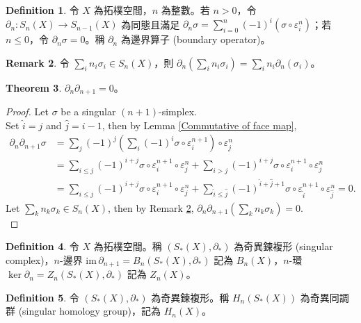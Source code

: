 \documentclass[12pt]{article}
\theoremstyle{definition}
\newtheorem{definition}{Definition}[section]
\newtheorem{theorem}[definition]{Theorem}
\newtheorem{remark}[definition]{Remark}
\newcommand\<{\langle}
\renewcommand\>{\rangle}
\newcommand\im{\mathrm{im}\hspace{2pt}}
\begin{document}
\begin{CJK}{UTF8}{bsmi}
\begin{definition}
    令 $X$ 為拓樸空間，$n$ 為整數。若 $n>0$，令 $\partial_n:S_n(X)\to S_{n-1}(X)$ 為同態且滿足 $\partial_n\sigma=\sum_{i=0}^n (-1)^i (\sigma\circ\varepsilon^n_i)$；若 $n\le0$，令 $\partial_n\sigma=0$。稱 $\partial_n$ 為邊界算子 (boundary operator)。
\end{definition}

\begin{remark}
\label{property of boundary operator}
    令 $\sum_i n_i \sigma_i\in S_n(X)$，則 $\partial_n\left(\sum_i n_i \sigma_i\right)=\sum_i n_i \partial_n(\sigma_i)$。 
\end{remark}

\begin{theorem}
    $\partial_n\partial_{n+1}=0$。
\end{theorem}
\begin{proof}
    Let $\sigma$ be a singular $(n+1)$-simplex. \\
    Set $\hat{i}=j$ and $\hat{j}=i-1$, then by Lemma \ref{Commutative of face map},
    \begin{align*}
        \partial_n\partial_{n+1}\sigma
        & = \sum_j(-1)^j\left(\sum_i(-1)^i\sigma\circ\varepsilon^{n+1}_i\right)\circ\varepsilon^n_j \\
        & = \sum_{i\le j}(-1)^{i+j}\sigma\circ\varepsilon^{n+1}_i\circ\varepsilon^n_j+\sum_{i>j}(-1)^{i+j}\sigma\circ\varepsilon^{n+1}_i\circ\varepsilon^n_j \\
        & = \sum_{i\le j}(-1)^{i+j}\sigma\circ\varepsilon^{n+1}_i\circ\varepsilon^n_j+\sum_{\hat{i}\le\hat{j}}(-1)^{\hat{i}+\hat{j}+1}\sigma\circ\varepsilon^{n+1}_{\hat{i}}\circ\varepsilon^n_{\hat{j}} 
        = 0.
    \end{align*}
    Let $\sum_k n_k \sigma_k\in S_n(X)$, then by Remark \ref{property of boundary operator}, $\partial_n\partial_{n+1}\left(\sum_k n_k \sigma_k\right)=0$. \\
\end{proof}

\begin{definition}
    令 $X$ 為拓樸空間。稱 $(S_*(X), \partial_*)$ 為奇異鍊複形 (singular complex)，$n$-邊界 $\im\partial_{n+1}=B_n(S_*(X), \partial_*)$ 記為 $B_n(X)$，$n$-環 $\ker\partial_n=Z_n(S_*(X), \partial_*)$ 記為 $Z_n(X)$。
\end{definition}

\begin{definition}
    令 $(S_*(X), \partial_*)$ 為奇異鍊複形。稱 $H_n(S_*(X))$ 為奇異同調群 (singular homology group)，記為 $H_n(X)$。
\end{definition}


\end{CJK}
\end{document}
